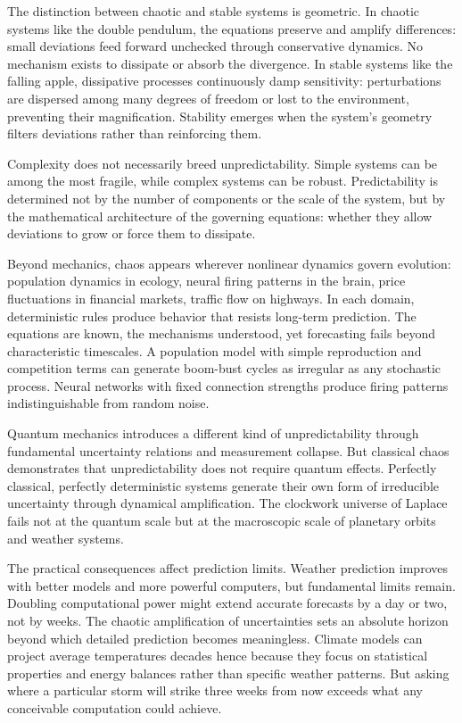 The distinction between chaotic and stable systems is geometric. In chaotic systems like the double pendulum, the equations preserve and amplify differences: small deviations feed forward unchecked through conservative dynamics. No mechanism exists to dissipate or absorb the divergence. In stable systems like the falling apple, dissipative processes continuously damp sensitivity: perturbations are dispersed among many degrees of freedom or lost to the environment, preventing their magnification. Stability emerges when the system's geometry filters deviations rather than reinforcing them.

Complexity does not necessarily breed unpredictability. Simple systems can be among the most fragile, while complex systems can be robust. Predictability is determined not by the number of components or the scale of the system, but by the mathematical architecture of the governing equations: whether they allow deviations to grow or force them to dissipate.

Beyond mechanics, chaos appears wherever nonlinear dynamics govern evolution: population dynamics in ecology, neural firing patterns in the brain, price fluctuations in financial markets, traffic flow on highways. In each domain, deterministic rules produce behavior that resists long-term prediction. The equations are known, the mechanisms understood, yet forecasting fails beyond characteristic timescales. A population model with simple reproduction and competition terms can generate boom-bust cycles as irregular as any stochastic process. Neural networks with fixed connection strengths produce firing patterns indistinguishable from random noise.

Quantum mechanics introduces a different kind of unpredictability through fundamental uncertainty relations and measurement collapse. But classical chaos demonstrates that unpredictability does not require quantum effects. Perfectly classical, perfectly deterministic systems generate their own form of irreducible uncertainty through dynamical amplification. The clockwork universe of Laplace fails not at the quantum scale but at the macroscopic scale of planetary orbits and weather systems.

The practical consequences affect prediction limits. Weather prediction improves with better models and more powerful computers, but fundamental limits remain. Doubling computational power might extend accurate forecasts by a day or two, not by weeks. The chaotic amplification of uncertainties sets an absolute horizon beyond which detailed prediction becomes meaningless. Climate models can project average temperatures decades hence because they focus on statistical properties and energy balances rather than specific weather patterns. But asking where a particular storm will strike three weeks from now exceeds what any conceivable computation could achieve.

